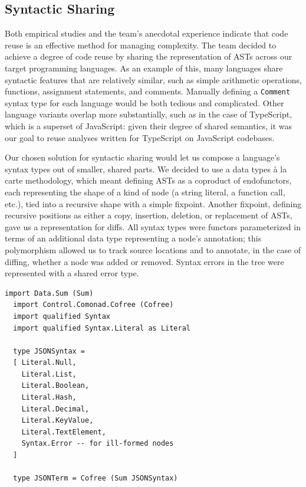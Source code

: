 \documentclass[acmsmall,fleqn]{acmart}
\begin{document}
\subsection{Syntactic Sharing} \label{sec:sharing}

Both empirical studies \cite{Haefliger08Code} and the team’s anecdotal
experience indicate that code reuse is an effective method for managing
complexity. The team decided to achieve a degree of code reuse by sharing the
representation of ASTs across our target programming languages. As an example of
this, many languages share syntactic features that are relatively similar, such
as simple arithmetic operations, functions, assignment statements, and comments.
Manually defining a \texttt{Comment} syntax type for each language would be both
tedious and complicated. Other language variants overlap more substantially,
such as in the case of TypeScript, which is a superset of JavaScript: given
their degree of shared semantics, it was our goal to reuse analyses written for
TypeScript on JavaScript codebases.

Our chosen solution for syntactic sharing would let us compose a language’s
syntax types out of smaller, shared parts. We decided to use a data types à la
carte \cite{Swierstra08Data} methodology, which meant defining ASTs as a
coproduct of endofunctors, each representing the shape of a kind of node (a
string literal, a function call, etc.), tied into a recursive shape with a
simple fixpoint. Another fixpoint, defining recursive positions as either a
copy, insertion, deletion, or replacement of ASTs, gave us a representation for
diffs. All syntax types were functors parameterized in terms of an additional
data type representing a node's annotation; this polymorphism allowed us to
track source locations and to annotate, in the case of diffing, whether a node
was added or removed. Syntax errors in the tree were represented with a shared
error type.

\begin{lstlisting}[label={code:dtalc}, keywords={type}, title=A representation of JSON syntax written with data types à la carte.]
  import Data.Sum (Sum)
  import Control.Comonad.Cofree (Cofree)
  import qualified Syntax
  import qualified Syntax.Literal as Literal

  type JSONSyntax =
  [ Literal.Null,
    Literal.List,
    Literal.Boolean,
    Literal.Hash,
    Literal.Decimal,
    Literal.KeyValue,
    Literal.TextElement,
    Syntax.Error -- for ill-formed nodes
  ]

  type JSONTerm = Cofree (Sum JSONSyntax)
\end{lstlisting}
\end{document}
